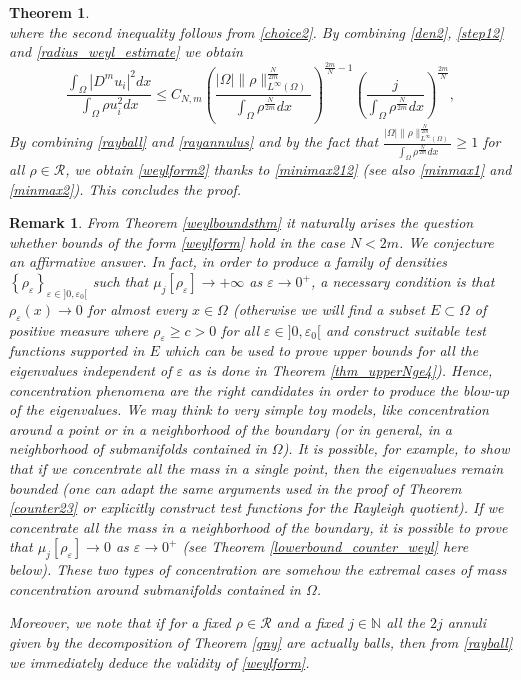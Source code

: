 \documentclass[11pt,a4paper]{amsart}
\numberwithin{equation}{section}
\newtheorem{thm}[equation]{Theorem}
\newtheorem{rem}[equation]{Remark}
\begin{document}
\begin{thm}
\begin{equation}
\end{equation}
where the second inequality follows from \eqref{choice2}. By combining \eqref{den2}, \eqref{step12} and \eqref{radius_weyl_estimate} we obtain
\begin{equation}\label{rayannulus}
\frac{\int_{\Omega}|D^mu_i|^2dx}{\int_{\Omega}\rho u_i^2 dx}\leq C_{N,m}\left(\frac{|\Omega|\|\rho\|_{L^{\infty}(\Omega)}^{\frac{N}{2m}}}{\int_{\Omega}\rho^{\frac{N}{2m}}dx}\right)^{\frac{2m}{N}-1}\left(\frac{j}{\int_{\Omega}\rho^{\frac{N}{2m}}dx}\right)^{\frac{2m}{N}},
\end{equation}
By combining \eqref{rayball} and \eqref{rayannulus} and by the fact that $\frac{|\Omega|\|\rho\|_{L^{\infty}(\Omega)}^{\frac{N}{2m}}}{\int_{\Omega}\rho^{\frac{N}{2m}}dx}\geq 1$ for all $\rho\in\mathcal R$, we obtain \eqref{weylform2} thanks to \eqref{minimax212} (see also \eqref{minmax1} and \eqref{minmax2}). This concludes the proof.
\end{thm}

\begin{rem}\label{openquestion}
From Theorem \ref{weylboundsthm} it naturally arises the question whether bounds of the form \eqref{weylform} hold in the case $N<2m$. We conjecture an affirmative answer. In fact, in order to produce a family of densities $\left\{\rho_{\varepsilon}\right\}_{\varepsilon\in]0,\varepsilon_0[}$ such that $\mu_j[\rho_{\varepsilon}]\rightarrow +\infty$ as $\varepsilon\rightarrow 0^+$, a necessary condition is that $\rho_{\varepsilon}(x)\rightarrow 0$ for almost every $x\in\Omega$ (otherwise we will find a subset $E\subset\Omega$ of positive measure where $\rho_{\varepsilon}\geq c>0$ for all $\varepsilon\in]0,\varepsilon_0[$ and construct suitable test functions supported in $E$ which can be used to prove upper bounds for all the eigenvalues independent of $\varepsilon$ as is done in Theorem \ref{thm_upperNge4}). Hence, concentration phenomena are the right candidates in order to produce the blow-up of the eigenvalues. We may think to very simple toy models, like concentration around a point or in a neighborhood of the boundary (or in general, in a neighborhood of submanifolds contained in $\Omega$). It is possible, for example, to show that if we concentrate all the mass in a single point, then the eigenvalues remain bounded (one can adapt the same arguments used in the proof of Theorem \ref{counter23} or explicitly construct test functions for the Rayleigh quotient). If we concentrate all the mass in a neighborhood of the boundary, it is possible to prove that $\mu_j[\rho_{\varepsilon}]\rightarrow 0$ as $\varepsilon\rightarrow 0^+$ (see Theorem \ref{lowerbound_counter_weyl} here below). These two types of concentration are somehow the extremal cases of mass concentration around submanifolds contained in $\Omega$.

Moreover, we note that if for a fixed $\rho\in\mathcal R$ and a fixed $j\in\mathbb N$ all the $2j$ annuli given by the decomposition of Theorem \ref{gny} are actually balls, then from \eqref{rayball} we immediately deduce the validity of \eqref{weylform}.
\end{rem}
\end{document}
